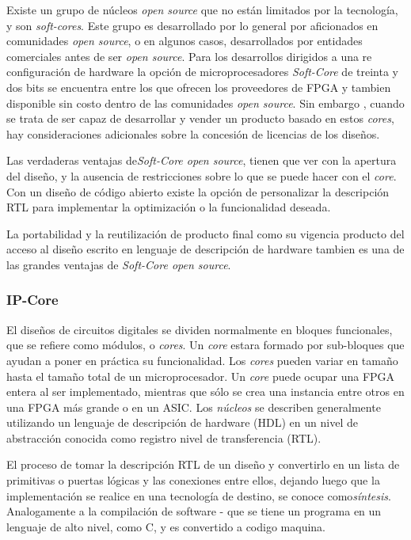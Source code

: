 Existe un grupo de núcleos \textit{open source} que no están limitados por la tecnología, y son \textit{soft-cores}. Este grupo es desarrollado por lo general por aficionados en comunidades \textit{open source}, o en algunos casos, desarrollados por entidades comerciales antes de ser \textit{open source}.
 Para los desarrollos dirigidos a una re configuración de hardware la opción de microprocesadores \textit{Soft-Core} de treinta y dos bits se encuentra entre los que ofrecen los proveedores de FPGA y tambien disponible sin costo dentro de las comunidades \textit{open source}. Sin embargo , cuando se trata de ser capaz de desarrollar y vender un producto basado en estos \textit{cores}, hay consideraciones adicionales sobre la concesión de licencias de los diseños.

Las verdaderas ventajas de\textit{Soft-Core open source}, tienen que ver con la apertura del diseño, y la ausencia de restricciones sobre lo que se puede hacer con el \textit{core}. Con un diseño de código abierto existe la opción de personalizar la descripción RTL para implementar la optimización o la funcionalidad deseada. 

La portabilidad y la reutilización de producto final como su vigencia producto del acceso al diseño escrito en lenguaje de descripción de hardware tambien es una de las grandes ventajas de \textit{Soft-Core open source}.

		
		\subsubsection{ IP-Core}

El diseños de circuitos digitales se dividen normalmente en bloques funcionales, que se refiere como módulos, o \textit{cores}. Un \textit{core} estara formado por sub-bloques que ayudan a poner en práctica su funcionalidad. Los \textit{cores} pueden variar en tamaño hasta el tamaño total de un microprocesador. Un \textit{core} puede ocupar una FPGA entera al ser implementado, mientras que sólo se crea una instancia entre otros en una FPGA más grande o en un ASIC. Los \textit{núcleos} se describen generalmente utilizando un lenguaje de descripción de hardware (HDL) en un nivel de abstracción conocida como registro nivel de transferencia (RTL).

El proceso de tomar la descripción RTL de un diseño y convertirlo en un lista de primitivas o puertas lógicas y las conexiones entre ellos, dejando luego que la  implementación se realice en una tecnología de destino, se conoce como\textit{síntesis}. Analogamente a la compilación de software - que se tiene un programa en un lenguaje de alto nivel, como C, y  es convertido a codigo maquina. 

